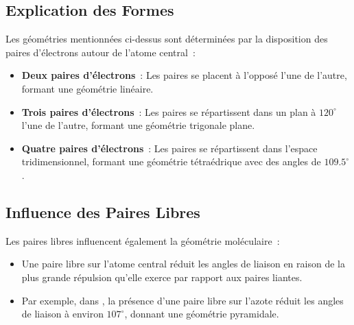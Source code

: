 \documentclass{article}
\begin{document}
\subsection{Explication des Formes}
Les géométries mentionnées ci-dessus sont déterminées par la disposition des paires
d'électrons autour de l'atome central~:
\begin{itemize}
    \item \textbf{Deux paires d'électrons}~: Les paires se placent à l'opposé l'une de l'autre,
    formant une géométrie linéaire.
    \item \textbf{Trois paires d'électrons}~: Les paires se répartissent dans un plan à
    $120^\circ$ l'une de l'autre, formant une géométrie trigonale plane.
    \item \textbf{Quatre paires d'électrons}~: Les paires se répartissent dans
    l'espace tridimensionnel, formant une géométrie tétraédrique avec des angles de $109.5^\circ$.
\end{itemize}

\subsection{Influence des Paires Libres}
Les paires libres influencent également la géométrie moléculaire~:
\begin{itemize}
    \item Une paire libre sur l'atome central réduit les angles de liaison en raison de la plus
    grande répulsion qu'elle exerce par rapport aux paires liantes.
    \item Par exemple, dans , la présence d'une paire libre sur l'azote réduit les angles
    de liaison à environ $107^\circ$, donnant une géométrie pyramidale.
\end{itemize}
\end{document}
